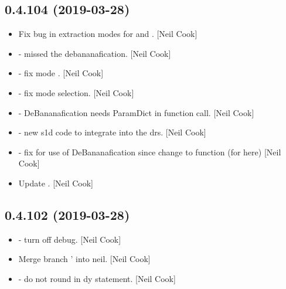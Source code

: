 \documentclass[a4paper,10pt,english]{report}
\begin{document}
\subsection{0.4.104 (2019-03-28)}
\label{\detokenize{misc/changelog:id156}}\begin{itemize}
\item {} 
Fix bug in extraction modes for  and
. {[}Neil Cook{]}

\item {} 
 - missed the debananafication. {[}Neil Cook{]}

\item {} 
 - fix mode . {[}Neil Cook{]}

\item {} 
 - fix mode selection. {[}Neil Cook{]}

\item {} 
 - DeBananafication needs ParamDict in function call.
{[}Neil Cook{]}

\item {} 
 - new s1d code to integrate into the drs.
{[}Neil Cook{]}

\item {} 
 - fix for use of DeBananafication since change to
function (for  here) {[}Neil Cook{]}

\item {} 
Update . {[}Neil Cook{]}

\end{itemize}


\subsection{0.4.102 (2019-03-28)}
\label{\detokenize{misc/changelog:id157}}\begin{itemize}
\item {} 
 - turn off  debug. {[}Neil Cook{]}

\item {} 
Merge branch ’ into neil. {[}Neil Cook{]}

\item {} 
 - do not round in dy statement. {[}Neil Cook{]}

\end{itemize}
\end{document}
